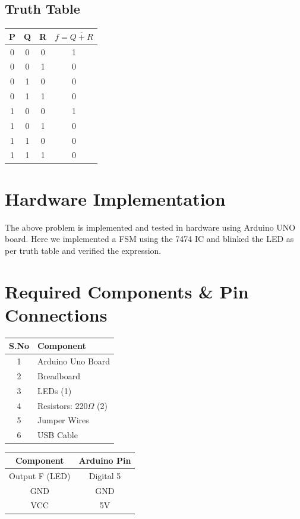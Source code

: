 \documentclass[a4paper,12pt]{article}
\begin{document}
\subsection*{Truth Table}

\begin{center}
\begin{tabular}{|c|c|c|c|}
\hline
P & Q & R & $f = \overline{Q + R}$ \\
\hline
0 & 0 & 0 & 1 \\
0 & 0 & 1 & 0 \\
0 & 1 & 0 & 0 \\
0 & 1 & 1 & 0 \\
1 & 0 & 0 & 1 \\
1 & 0 & 1 & 0 \\
1 & 1 & 0 & 0 \\
1 & 1 & 1 & 0 \\
\hline
\end{tabular}
\end{center}
\section*{\textbf{Hardware Implementation}}
The above problem is implemented and tested in hardware using Arduino UNO board. Here we implemented a FSM using the 7474 IC and blinked the LED as per truth table and verified the expression.
\section*{Required Components \& Pin Connections}
\begin{center}
\begin{minipage}{0.45\textwidth}
\begin{table}[H]
\centering
\begin{tabular}{|c|l|}
\hline
\textbf{S.No} & \textbf{Component} \\ \hline
1 & Arduino Uno Board \\
2 & Breadboard  \\
3 & LEDs (1) \\
4 & Resistors: 220$\Omega$ (2) \\
5 & Jumper Wires \\
6 & USB Cable \\
\hline
\end{tabular}
\end{table}
\end{minipage}
\hspace{0.05\textwidth}
\begin{minipage}{0.45\textwidth}
\begin{table}[H]
\centering
\begin{tabular}{|c|c|}
\hline
\textbf{Component} & \textbf{Arduino Pin} \\ \hline
Output F (LED) & Digital 5 \\
GND & GND \\
VCC & 5V \\
\hline
\end{tabular}
\end{table}
\end{minipage}
\end{center}
\end{document}

